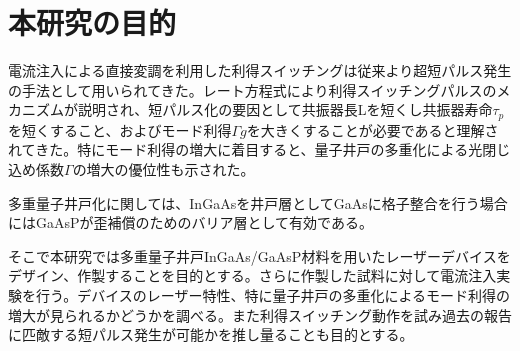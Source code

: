 \section{本研究の目的}
電流注入による直接変調を利用した利得スイッチングは従来より超短パルス発生の手法として用いられてきた。レート方程式により利得スイッチングパルスのメカニズムが説明され、短パルス化の要因として共振器長Lを短くし共振器寿命$\tau_{p}$を短くすること、およびモード利得$\Gamma g$を大きくすることが必要であると理解されてきた。特にモード利得の増大に着目すると、量子井戸の多重化による光閉じ込め係数$\Gamma$の増大の優位性も示された。

多重量子井戸化に関しては、InGaAsを井戸層としてGaAsに格子整合を行う場合にはGaAsPが歪補償のためのバリア層として有効である。

そこで本研究では多重量子井戸InGaAs/GaAsP材料を用いたレーザーデバイスをデザイン、作製することを目的とする。さらに作製した試料に対して電流注入実験を行う。デバイスのレーザー特性、特に量子井戸の多重化によるモード利得の増大が見られるかどうかを調べる。また利得スイッチング動作を試み過去の報告に匹敵する短パルス発生が可能かを推し量ることも目的とする。
